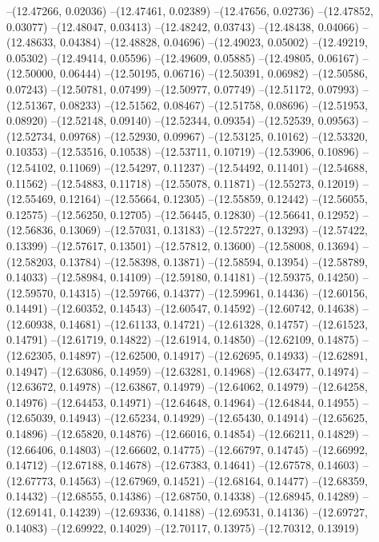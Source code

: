 --(12.47266, 0.02036)
--(12.47461, 0.02389)
--(12.47656, 0.02736)
--(12.47852, 0.03077)
--(12.48047, 0.03413)
--(12.48242, 0.03743)
--(12.48438, 0.04066)
--(12.48633, 0.04384)
--(12.48828, 0.04696)
--(12.49023, 0.05002)
--(12.49219, 0.05302)
--(12.49414, 0.05596)
--(12.49609, 0.05885)
--(12.49805, 0.06167)
--(12.50000, 0.06444)
--(12.50195, 0.06716)
--(12.50391, 0.06982)
--(12.50586, 0.07243)
--(12.50781, 0.07499)
--(12.50977, 0.07749)
--(12.51172, 0.07993)
--(12.51367, 0.08233)
--(12.51562, 0.08467)
--(12.51758, 0.08696)
--(12.51953, 0.08920)
--(12.52148, 0.09140)
--(12.52344, 0.09354)
--(12.52539, 0.09563)
--(12.52734, 0.09768)
--(12.52930, 0.09967)
--(12.53125, 0.10162)
--(12.53320, 0.10353)
--(12.53516, 0.10538)
--(12.53711, 0.10719)
--(12.53906, 0.10896)
--(12.54102, 0.11069)
--(12.54297, 0.11237)
--(12.54492, 0.11401)
--(12.54688, 0.11562)
--(12.54883, 0.11718)
--(12.55078, 0.11871)
--(12.55273, 0.12019)
--(12.55469, 0.12164)
--(12.55664, 0.12305)
--(12.55859, 0.12442)
--(12.56055, 0.12575)
--(12.56250, 0.12705)
--(12.56445, 0.12830)
--(12.56641, 0.12952)
--(12.56836, 0.13069)
--(12.57031, 0.13183)
--(12.57227, 0.13293)
--(12.57422, 0.13399)
--(12.57617, 0.13501)
--(12.57812, 0.13600)
--(12.58008, 0.13694)
--(12.58203, 0.13784)
--(12.58398, 0.13871)
--(12.58594, 0.13954)
--(12.58789, 0.14033)
--(12.58984, 0.14109)
--(12.59180, 0.14181)
--(12.59375, 0.14250)
--(12.59570, 0.14315)
--(12.59766, 0.14377)
--(12.59961, 0.14436)
--(12.60156, 0.14491)
--(12.60352, 0.14543)
--(12.60547, 0.14592)
--(12.60742, 0.14638)
--(12.60938, 0.14681)
--(12.61133, 0.14721)
--(12.61328, 0.14757)
--(12.61523, 0.14791)
--(12.61719, 0.14822)
--(12.61914, 0.14850)
--(12.62109, 0.14875)
--(12.62305, 0.14897)
--(12.62500, 0.14917)
--(12.62695, 0.14933)
--(12.62891, 0.14947)
--(12.63086, 0.14959)
--(12.63281, 0.14968)
--(12.63477, 0.14974)
--(12.63672, 0.14978)
--(12.63867, 0.14979)
--(12.64062, 0.14979)
--(12.64258, 0.14976)
--(12.64453, 0.14971)
--(12.64648, 0.14964)
--(12.64844, 0.14955)
--(12.65039, 0.14943)
--(12.65234, 0.14929)
--(12.65430, 0.14914)
--(12.65625, 0.14896)
--(12.65820, 0.14876)
--(12.66016, 0.14854)
--(12.66211, 0.14829)
--(12.66406, 0.14803)
--(12.66602, 0.14775)
--(12.66797, 0.14745)
--(12.66992, 0.14712)
--(12.67188, 0.14678)
--(12.67383, 0.14641)
--(12.67578, 0.14603)
--(12.67773, 0.14563)
--(12.67969, 0.14521)
--(12.68164, 0.14477)
--(12.68359, 0.14432)
--(12.68555, 0.14386)
--(12.68750, 0.14338)
--(12.68945, 0.14289)
--(12.69141, 0.14239)
--(12.69336, 0.14188)
--(12.69531, 0.14136)
--(12.69727, 0.14083)
--(12.69922, 0.14029)
--(12.70117, 0.13975)
--(12.70312, 0.13919)
